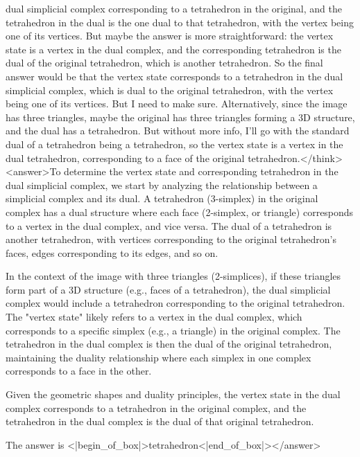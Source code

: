 dual simplicial complex corresponding to a tetrahedron in the original, and the tetrahedron in the dual is the one dual to that tetrahedron, with the vertex being one of its vertices. But maybe the answer is more straightforward: the vertex state is a vertex in the dual complex, and the corresponding tetrahedron is the dual of the original tetrahedron, which is another tetrahedron. So the final answer would be that the vertex state corresponds to a tetrahedron in the dual simplicial complex, which is dual to the original tetrahedron, with the vertex being one of its vertices. But I need to make sure. Alternatively, since the image has three triangles, maybe the original has three triangles forming a 3D structure, and the dual has a tetrahedron. But without more info, I'll go with the standard dual of a tetrahedron being a tetrahedron, so the vertex state is a vertex in the dual tetrahedron, corresponding to a face of the original tetrahedron.</think><answer>To determine the vertex state and corresponding tetrahedron in the dual simplicial complex, we start by analyzing the relationship between a simplicial complex and its dual. A tetrahedron (3-simplex) in the original complex has a dual structure where each face (2-simplex, or triangle) corresponds to a vertex in the dual complex, and vice versa. The dual of a tetrahedron is another tetrahedron, with vertices corresponding to the original tetrahedron's faces, edges corresponding to its edges, and so on.  

In the context of the image with three triangles (2-simplices), if these triangles form part of a 3D structure (e.g., faces of a tetrahedron), the dual simplicial complex would include a tetrahedron corresponding to the original tetrahedron. The "vertex state" likely refers to a vertex in the dual complex, which corresponds to a specific simplex (e.g., a triangle) in the original complex. The tetrahedron in the dual complex is then the dual of the original tetrahedron, maintaining the duality relationship where each simplex in one complex corresponds to a face in the other.  

Given the geometric shapes and duality principles, the vertex state in the dual complex corresponds to a tetrahedron in the original complex, and the tetrahedron in the dual complex is the dual of that original tetrahedron.  

The answer is <|begin_of_box|>tetrahedron<|end_of_box|></answer>